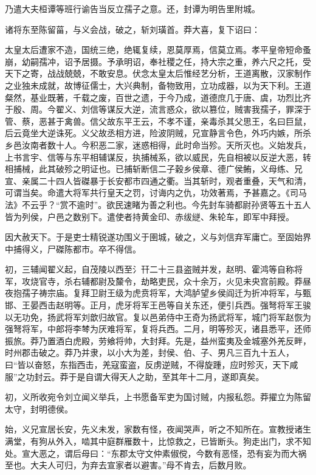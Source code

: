 \documentclass[]{article}
\begin{document}
乃遣大夫桓谭等班行谕告当反立孺子之意。还，封谭为明告里附城。

诸将东至陈留菑，与义会战，破之，斩刘璜首。莽大喜，复下诏曰：

太皇太后遭家不造，国统三绝，绝辄复续，恩莫厚焉，信莫立焉。孝平皇帝短命蚤崩，幼嗣孺冲，诏予居摄。予承明诏，奉社稷之任，持大宗之重，养六尺之托，受天下之寄，战战兢兢，不敢安息。伏念太皇太后惟经艺分析，王道离散，汉家制作之业独未成就，故博征儒士，大兴典制，备物致用，立功成器，以为天下利。王道粲然，基业既著，千载之废，百世之遗，于今乃成，道德庶几于唐、虞，功烈比齐于殷、周。今翟义、刘信等谋反大逆，流言惑众，欲以篡位，贼害我孺子，罪深于管、蔡，恶甚于禽兽。信父故东平王云，不孝不谨，亲毒杀其父思王，名曰巨鼠，后云竟坐大逆诛死。义父故丞相方进，险波阴贼，兄宣静言令色，外巧内嫉，所杀乡邑汝南者数十人。今积恶二家，迷惑相得，此时命当殄。天所灭也。义始发兵，上书言宇、信等与东平相辅谋反，执捕械系，欲以威民，先自相被以反逆大恶，转相捕械，此其破殄之明证也。已捕斩断信二子穀乡侯章、德广侯鲔，义母练、兄宣、亲属二十四人皆磔暴于长安都市四通之衢。当其斩时，观者重叠，天气和清，可谓当矣。命遣大将军共行皇天之罚，讨诲内之仇，功效著焉，予甚嘉之。《司马法》不云乎？``赏不逾时''。欲民速睹为善之利也。今先封车骑都尉孙贤等五十五人皆为列侯，户邑之数别下。遣使者持黄金印、赤绂縌、朱轮车，即军中拜授。

因大赦天下。于是吏士精锐遂功围义于圉城，破之，义与刘信弃军庸亡。至固始界中捕得义，尸磔陈都市。卒不得信。

初，三辅闻翟义起，自茂陵以西至氵幵二十三县盗贼并发，赵明、霍鸿等自称将军，攻烧官寺，杀右辅都尉及斄令，劫略吏民，众十余万，火见未央宫前殿。莽昼夜抱孺子祷宗庙。复拜卫尉王级为虎贲将军，大鸿胪望乡侯阎迁为折冲将军，与甄邯、王晏西击赵明等。正月，虎牙将军王邑等自关东还，便引兵西。强弩将军王骏以无功免，扬武将军刘歆归故官。复以邑弟侍中王奇为扬武将军，城门将军赵恢为强弩将军，中郎将李棽为厌难将军，复将兵西。二月，明等殄灭，诸县悉平，还师振旅。莽乃置酒白虎殿，劳飨将帅，大封拜。先是，益州蛮夷及金城塞外羌反畔，时州郡击破之。莽乃并隶，以小大为差，封侯、伯、子、男凡三百九十五人，曰``皆以奋怒，东指西击，羌寇蛮盗，反虏逆贼，不得旋踵，应时殄灭，天下咸服''之功封云。莽于是自谓大得天人之助，至其年十二月，遂即真矣。

初，义所收宛令刘立闻义举兵，上书愿备军吏为国讨贼，内报私怨。莽擢立为陈留太守，封明德侯。

始，义兄宣居长安，先义未发，家数有怪，夜闻哭声，听之不知所在。宣教授诸生满堂，有狗从外入，啮其中庭群雁数十，比惊救之，已皆断头。狗走出门，求不知处。宣大恶之，谓后母曰：``东郡太守文仲素俶傥，今数有恶怪，恐有妄为而大祸至也。大夫人可归，为弃去宣家者以避害。''母不肯去，后数月败。
\end{document}
